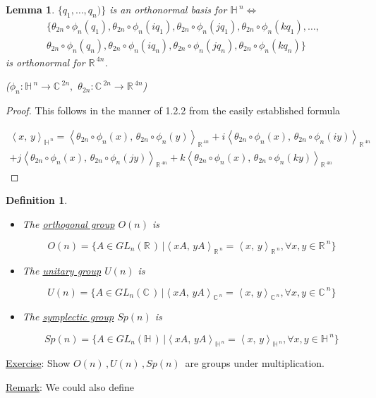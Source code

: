 \documentclass[12pt,a4paper]{article}
\newcommand{\rR}{\ensuremath{\mathbb{R}\,}}
\newcommand{\cC}{\ensuremath{\mathbb{C}\,}}
\newcommand{\hH}{\ensuremath{\mathbb{H}\,}}
\newcommand{\glnr}{\ensuremath{GL_n(\rR)\,}}
\newcommand{\glnc}{\ensuremath{GL_n(\cC)\,}}
\newcommand{\glnh}{\ensuremath{GL_n(\hH)\,}}
\newcommand{\gon}{\ensuremath{O(n)\,}}
\newcommand{\gun}{\ensuremath{U(n)\,}}
\newcommand{\gspn}{\ensuremath{Sp(n)\,}}
\newcommand{\ipm}[2]{\ensuremath{\left\langle #1, \, #2 \right\rangle}}
\newcommand{\ul}[1]{\underline{#1}}
\newtheorem{defn}[thm]{Definition}
\newtheorem{lemma}[thm]{Lemma}
\begin{document}
\begin{lemma}
$\{q_1, \ldots , q_n)\}$ is an orthonormal basis for $\hH^n \iff$
\begin{gather*}
\{\theta_{2n}\circ\phi_{n}(q_1), \theta_{2n}\circ\phi_{n}(iq_1), \theta_{2n}\circ\phi_{n}(jq_1), \theta_{2n}\circ\phi_{n}(k q_1), \ldots, 
\\ \theta_{2n}\circ\phi_{n}(q_n), \theta_{2n}\circ\phi_{n}(iq_n), \theta_{2n}\circ\phi_{n}(jq_n), \theta_{2n}\circ\phi_{n}(k q_n)\}
\end{gather*}
is orthonormal for $\rR^{4n}$.

($\phi_n: \hH^n \to \cC^{2n},$  $\theta_{2n}: \cC^{2n} \to \rR^{4n}$) 
\end{lemma}
\begin{proof}
This follows in the manner of 1.2.2 from the easily established formula

\begin{gather*}
\ipm{x}{y}_{\hH^n}= 
\ipm{\theta_{2n}\circ\phi_{n}(x)}{\theta_{2n}\circ\phi_{n}(y)}_{\rR^{4n}}
+i\ipm{\theta_{2n}\circ\phi_{n}(x)}{\theta_{2n}\circ\phi_{n}(iy)}_{\rR^{4n}}\\
+j\ipm{\theta_{2n}\circ\phi_{n}(x)}{\theta_{2n}\circ\phi_{n}(jy)}_{\rR^{4n}}
+k\ipm{\theta_{2n}\circ\phi_{n}(x)}{\theta_{2n}\circ\phi_{n}(ky)}_{\rR^{4n}}
\end{gather*}
\end{proof}

\begin{defn}
\begin{itemize}
\item[1)] The \ul{orthogonal group} $O(n)$ is 

\[O(n)=\{A\in \glnr | \ipm{xA}{yA}_{\rR^{n}}=\ipm{x}{y}_{\rR^{n}}, \forall x,y \in \rR^n\}\]

\item[2)] The \ul{unitary group} $U(n)$ is 

\[U(n)=\{A\in \glnc | \ipm{xA}{yA}_{\cC^{n}}=\ipm{x}{y}_{\cC^{n}}, \forall x,y \in \cC^n\}\]

\item[3)] The \ul{symplectic group} $Sp(n)$ is 

\[Sp(n)=\{A\in \glnh | \ipm{xA}{yA}_{\hH^{n}}=\ipm{x}{y}_{\hH^{n}}, \forall x,y \in \hH^n\}\]
\end{itemize}
\end{defn}

\ul{Exercise}: Show $\gon , \gun ,\gspn$ are groups under multiplication.

\ul{Remark}: We could also define 
\end{document}
